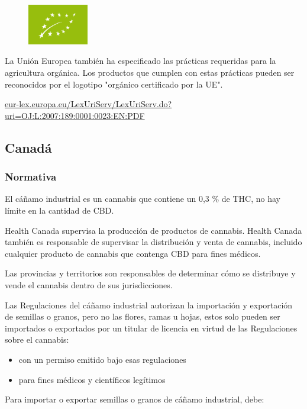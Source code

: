 \documentclass{article}
\begin{document}
\begin{figure}[H]
	\includegraphics[width=100px]{res/eu-organic.png}
	\label{fig:euorganic}
\end{figure}

La Unión Europea también ha especificado las prácticas requeridas para la agricultura orgánica. Los productos que cumplen con estas prácticas pueden ser reconocidos por el logotipo "orgánico certificado por la UE".

\url{eur-lex.europa.eu/LexUriServ/LexUriServ.do?uri=OJ:L:2007:189:0001:0023:EN:PDF}

\newpage

\subsection{Canadá}

\subsubsection{Normativa}

El cáñamo industrial es un cannabis que contiene un 0,3 \% de THC, no hay límite en la cantidad de CBD.

Health Canada supervisa la producción de productos de cannabis. Health Canada también es responsable de supervisar la distribución y venta de cannabis, incluido cualquier producto de cannabis que contenga CBD para fines médicos.

Las provincias y territorios son responsables de determinar cómo se distribuye y vende el cannabis dentro de sus jurisdicciones.

Las Regulaciones del cáñamo industrial autorizan la importación y exportación de semillas o granos, pero no las flores, ramas u hojas, estos solo pueden ser importados o exportados por un titular de licencia en virtud de las Regulaciones sobre el cannabis:

\begin{itemize}
	\item con un permiso emitido bajo esas regulaciones
	\item para fines médicos y científicos legítimos
\end{itemize}

Para importar o exportar semillas o granos de cáñamo industrial, debe:
\end{document}
